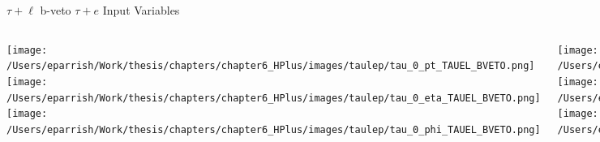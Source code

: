 \documentclass[aspectratio=169,xcolor=table]{beamer}
\begin{document}
    \begin{frame}[t]{$\tau+\ell$ b-veto $\tau+e$ Input Variables}
      \begin{columns}[t]
          \texttt{[image: /Users/eparrish/Work/thesis/chapters/chapter6\_HPlus/images/taulep/tau\_0\_pt\_TAUEL\_BVETO.png]}
          \texttt{[image: /Users/eparrish/Work/thesis/chapters/chapter6\_HPlus/images/taulep/tau\_0\_eta\_TAUEL\_BVETO.png]}
          \texttt{[image: /Users/eparrish/Work/thesis/chapters/chapter6\_HPlus/images/taulep/tau\_0\_phi\_TAUEL\_BVETO.png]}

          \texttt{[image: /Users/eparrish/Work/thesis/chapters/chapter6\_HPlus/images/taulep/met\_et\_TAUEL\_BVETO.png]}
          \texttt{[image: /Users/eparrish/Work/thesis/chapters/chapter6\_HPlus/images/taulep/met\_phi\_TAUEL\_BVETO.png]}
          \texttt{[image: /Users/eparrish/Work/thesis/chapters/chapter6\_HPlus/images/taulep/jet\_1\_pt\_TAUEL\_BVETO.png]}

          \texttt{[image: /Users/eparrish/Work/thesis/chapters/chapter6\_HPlus/images/taulep/bjet\_0\_pt\_TAUEL\_BVETO.png]}
          \texttt{[image: /Users/eparrish/Work/thesis/chapters/chapter6\_HPlus/images/taulep/bjet\_0\_eta\_TAUEL\_BVETO.png]}
          \texttt{[image: /Users/eparrish/Work/thesis/chapters/chapter6\_HPlus/images/taulep/bjet\_0\_phi\_TAUEL\_BVETO.png]}

          \texttt{[image: /Users/eparrish/Work/thesis/chapters/chapter6\_HPlus/images/taulep/tau\_0\_upsilon\_TAUEL\_BVETO.png]}
          \texttt{[image: /Users/eparrish/Work/thesis/chapters/chapter6\_HPlus/images/taulep/tau\_0\_charged\_tracks\_0\_pt\_TAUEL\_BVETO.png]}

      \end{columns}
    \end{frame}
\end{document}
